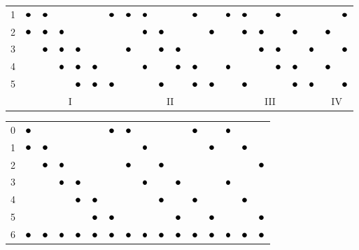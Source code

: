 \documentclass[eikonal.tex]{subfiles}
\begin{document}
\begin{figure}
{\begin{tabular}{c|cccccc|cccccc|cccccc|cc}
      1 & $\groupmarker$ & $\groupmarker$ & & & & $\groupmarker$ & $\groupmarker$ & $\groupmarker$ & & & $\groupmarker$ & & $\groupmarker$ & $\groupmarker$ & & $\groupmarker$ & & & & $\groupmarker$ \\
      2 & $\groupmarker$ & $\groupmarker$ & $\groupmarker$ & & & & & $\groupmarker$ & $\groupmarker$ & & & $\groupmarker$ & & $\groupmarker$ & $\groupmarker$ & & $\groupmarker$ & & $\groupmarker$ & \\
      3 & & $\groupmarker$ & $\groupmarker$ & $\groupmarker$ & & & $\groupmarker$ & & $\groupmarker$ & $\groupmarker$ & & & & & $\groupmarker$ & $\groupmarker$ & & $\groupmarker$ & & $\groupmarker$ \\
      4 & & & $\groupmarker$ & $\groupmarker$ & $\groupmarker$ & & & $\groupmarker$ & & $\groupmarker$ & $\groupmarker$ & & $\groupmarker$ & & & $\groupmarker$ & $\groupmarker$ & & $\groupmarker$ & \\
      5 & & & & $\groupmarker$ & $\groupmarker$ & $\groupmarker$ & & & $\groupmarker$ & & $\groupmarker$ & $\groupmarker$ & & $\groupmarker$ & & & $\groupmarker$ & $\groupmarker$ & & $\groupmarker$ \\
      \multicolumn{1}{c}{} & \multicolumn{6}{c}{I} & \multicolumn{6}{c}{II} & \multicolumn{6}{c}{III} & \multicolumn{2}{c}{IV}
    \end{tabular}%
    \vspace{0.5em}
    \begin{tabular}{c|cccccc|cccccc|ccc}
      0 & $\groupmarker$ & & & & & $\groupmarker$ & $\groupmarker$ & & & & $\groupmarker$ & & $\groupmarker$ & & \\
      1 & $\groupmarker$ & $\groupmarker$ & & & & & & $\groupmarker$ & & & & $\groupmarker$ & & $\groupmarker$ & \\
      2 & & $\groupmarker$ & $\groupmarker$ & & & & $\groupmarker$ & & $\groupmarker$ & & & & & & $\groupmarker$ \\
      3 & & & $\groupmarker$ & $\groupmarker$ & & & & $\groupmarker$ & & $\groupmarker$ & & & $\groupmarker$ & & \\
      4 & & & & $\groupmarker$ & $\groupmarker$ & & & & $\groupmarker$ & & $\groupmarker$ & & & $\groupmarker$ & \\
      5 & & & & & $\groupmarker$ & $\groupmarker$ & & & & $\groupmarker$ & & $\groupmarker$ & & & $\groupmarker$ \\
      6 & $\groupmarker$ & $\groupmarker$ & $\groupmarker$ & $\groupmarker$ & $\groupmarker$ & $\groupmarker$ & $\groupmarker$ & $\groupmarker$ & $\groupmarker$ & $\groupmarker$ & $\groupmarker$ & $\groupmarker$ & $\groupmarker$ & $\groupmarker$ & $\groupmarker$ \\

\end{tabular}}
\end{figure}
\end{document}
